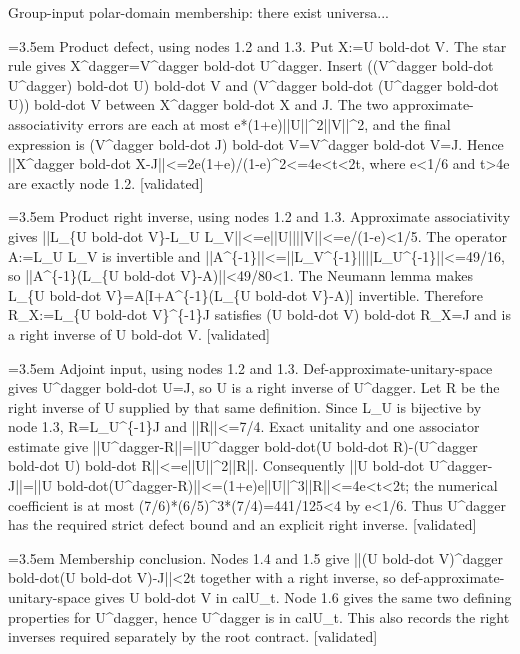 \documentclass{article}
\newcommand{\step}[1]{\par\noindent\hangindent=3.5em\hangafter=1%
  \makebox[3.5em][l]{\textbf{#1.}}}
\newcommand{\steptag}[1]{\hfill{\small\textsf{[#1]}}}
\begin{document}
\begin{proofbox}{Group-input polar-domain membership: there exist universa...}
\step{1.4} Product defect, using nodes 1.2 and 1.3. Put X:=U bold-dot V. The star rule gives X\textasciicircum{}dagger=V\textasciicircum{}dagger bold-dot U\textasciicircum{}dagger. Insert ((V\textasciicircum{}dagger bold-dot U\textasciicircum{}dagger) bold-dot U) bold-dot V and (V\textasciicircum{}dagger bold-dot (U\textasciicircum{}dagger bold-dot U)) bold-dot V between X\textasciicircum{}dagger bold-dot X and J. The two approximate-associativity errors are each at most e*(1+e)||U||\textasciicircum{}2||V||\textasciicircum{}2, and the final expression is (V\textasciicircum{}dagger bold-dot J) bold-dot V=V\textasciicircum{}dagger bold-dot V=J. Hence ||X\textasciicircum{}dagger bold-dot X-J||<=2e(1+e)/(1-e)\textasciicircum{}2<=4e<t<2t, where e<1/6 and t>4e are exactly node 1.2. \steptag{validated} \\[4pt]
\step{1.5} Product right inverse, using nodes 1.2 and 1.3. Approximate associativity gives ||L\_\{U bold-dot V\}-L\_U L\_V||<=e||U||||V||<=e/(1-e)<1/5. The operator A:=L\_U L\_V is invertible and ||A\textasciicircum{}\{-1\}||<=||L\_V\textasciicircum{}\{-1\}||||L\_U\textasciicircum{}\{-1\}||<=49/16, so ||A\textasciicircum{}\{-1\}(L\_\{U bold-dot V\}-A)||<49/80<1. The Neumann lemma makes L\_\{U bold-dot V\}=A[I+A\textasciicircum{}\{-1\}(L\_\{U bold-dot V\}-A)] invertible. Therefore R\_X:=L\_\{U bold-dot V\}\textasciicircum{}\{-1\}J satisfies (U bold-dot V) bold-dot R\_X=J and is a right inverse of U bold-dot V. \steptag{validated} \\[4pt]
\step{1.6} Adjoint input, using nodes 1.2 and 1.3. Def-approximate-unitary-space gives U\textasciicircum{}dagger bold-dot U=J, so U is a right inverse of U\textasciicircum{}dagger. Let R be the right inverse of U supplied by that same definition. Since L\_U is bijective by node 1.3, R=L\_U\textasciicircum{}\{-1\}J and ||R||<=7/4. Exact unitality and one associator estimate give ||U\textasciicircum{}dagger-R||=||U\textasciicircum{}dagger bold-dot(U bold-dot R)-(U\textasciicircum{}dagger bold-dot U) bold-dot R||<=e||U||\textasciicircum{}2||R||. Consequently ||U bold-dot U\textasciicircum{}dagger-J||=||U bold-dot(U\textasciicircum{}dagger-R)||<=(1+e)e||U||\textasciicircum{}3||R||<=4e<t<2t; the numerical coefficient is at most (7/6)*(6/5)\textasciicircum{}3*(7/4)=441/125<4 by e<1/6. Thus U\textasciicircum{}dagger has the required strict defect bound and an explicit right inverse. \steptag{validated} \\[4pt]
\step{1.7} Membership conclusion. Nodes 1.4 and 1.5 give ||(U bold-dot V)\textasciicircum{}dagger bold-dot(U bold-dot V)-J||<2t together with a right inverse, so def-approximate-unitary-space gives U bold-dot V in calU\_t. Node 1.6 gives the same two defining properties for U\textasciicircum{}dagger, hence U\textasciicircum{}dagger is in calU\_t. This also records the right inverses required separately by the root contract. \steptag{validated} \\[4pt]

\end{proofbox}
\end{document}
